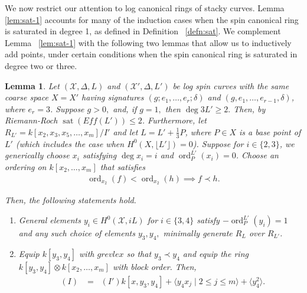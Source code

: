 \documentclass{amsart}
\theoremstyle{plain}
\newtheorem{lem}[thm]{Lemma}
\theoremstyle{definition}
\theoremstyle{remark}
\numberwithin{equation}{section}
\DeclareMathOperator{\ord}{ord}
\newcommand\sx{\mathscr X}
\newcommand{\halfcan}{L}
\DeclareMathOperator{\initial}{in_\prec}
\DeclareMathOperator{\sat}{sat}
\begin{document}
We now restrict our attention to log canonical rings of stacky curves.  Lemma \ref{lem:sat-1} accounts for many of the induction cases when the spin canonical ring is saturated in degree 1, as defined in Definition ~\ref{defn:sat}.  We complement Lemma ~\ref{lem:sat-1} with the following two lemmas that allow us to inductively add points, under certain conditions when the spin canonical ring is saturated in degree two or three.

\begin{lem}
\label{lem:sat-2}
Let $(\sx, \Delta, \halfcan)$ and $(\sx', \Delta, \halfcan')$ be log spin curves with the same coarse space $X = X'$ having signatures $(g; e_1, \ldots, e_r; \delta)$ and $(g, e_1, \ldots, e_{r- 1}, \delta)$, where $e_r=3$.  Suppose $g > 0,$ and, if $g = 1,$ then $\deg 3\halfcan' \geq 2.$ Then, by Riemann-Roch $\sat(Eff(L'))\le 2$.
Furthermore, let $R_{\halfcan'} = k[x_2, x_3
, x_5, \ldots, x_m]/I'$ and let $\halfcan = \halfcan' + \frac{1}{
3}P$, where $P\in X$ is a base point of $\halfcan'$ (which includes the case when $H^0(X, \lfloor \halfcan'\rfloor) = 0$).
Suppose for $i \in \{2, 3\}$, we generically choose $x_i$ satisfying $\deg x_i = i$ and $\ord_P^{\halfcan'}(x_i)= 0$. Choose an ordering on $k[x_2, \ldots, x_m]$ that satisfies
\begin{align*}
	\ord_{x_2}(f) < \ord_{x_2}(h) \implies f \prec h.
\end{align*}

\noindent
Then, the following statements hold.

\begin{enumerate}
	\item[(a)] General elements  $y_i \in H^0(\sx,iL)$ for $i \in
		\{3, 4\}$ satisfy $-\ord_P^{\halfcan'}(y_i) = 1$ and any such choice of elements
		$y_3, y_4,$ minimally generate $R_\halfcan$ over $R_{\halfcan'}$.
	\item[(b)] Equip $k[y_3, y_4]$ with $grevlex$ so that $y_3 \prec 
		y_4$
		and equip the ring $k[y_3, y_4] \otimes k[x_2, \ldots, x_m]$ with block 
		order. Then,
		\begin{align*}
			\initial(I) &= \initial(I')k[x, y_3, y_4]+\langle y_4 x_j \mid 2 \leq j \leq m \rangle +\langle y_4^2 \rangle.
		\end{align*}
\end{enumerate}
\end{lem}
\end{document}
